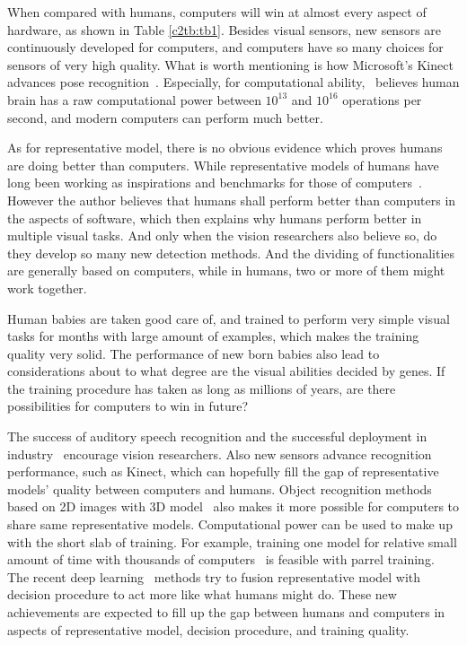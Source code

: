 When compared with humans, computers will win at almost every aspect of hardware, as shown in Table \ref{c2tb:tb1}. Besides visual sensors, new sensors are continuously developed for computers, and computers have so many choices for sensors of very high quality. What is worth mentioning is how Microsoft's Kinect advances pose recognition~\citep{knct}. Especially, for computational ability,~\citep{bpw} believes human brain has a raw computational power between $10^{13}$ and $10^{16}$ operations per second, and modern computers can perform much better.

 As for representative model, there is no obvious evidence which proves humans are doing better than computers. While representative models of humans have long been working as inspirations and benchmarks for those of computers~\citep{rbm}. However the author believes that humans shall perform better than computers in the aspects of software, which then explains why humans perform better in multiple visual tasks. And only when the vision researchers also believe so, do they develop  so many new detection methods. And the  dividing of functionalities  are generally based on computers, while in humans, two or more of them might work together.

Human babies are taken good care of, and trained to perform very simple visual tasks for months with large amount of examples, which makes the training quality very solid. The performance of new born babies also lead to considerations about to what degree are the visual abilities decided by genes. If the training procedure has taken as long as millions of years, are there possibilities for computers to win in future?

The success of auditory speech recognition and the successful deployment in industry~\citep{siri} encourage vision researchers. Also new sensors advance recognition performance, such as Kinect, which can hopefully fill the gap of representative models' quality between computers and humans. Object recognition methods based on 2D images with 3D model~\citep{r3d} also makes it more possible for computers to share same representative models.  Computational power can be used to make up with the short slab of training. For example, training one model for relative small amount of time with thousands of computers~\citep{dnnnn} is feasible with parrel training. The recent deep learning~\citep{dlearn} methods try to fusion representative model with decision procedure to act more like what humans might do. These new achievements are expected to fill up the gap between humans and computers in aspects of representative model, decision procedure, and training quality.



